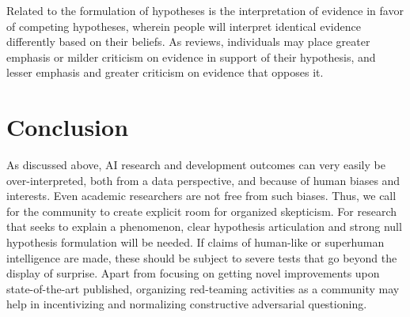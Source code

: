 \documentclass{article}
\theoremstyle{plain}
\theoremstyle{definition}
\theoremstyle{remark}
\begin{document}
Related to the formulation of hypotheses is the interpretation of evidence in favor of competing hypotheses, wherein people will interpret identical evidence differently based on their beliefs. As \citet{nickerson1998confirmation} reviews, individuals may place greater emphasis or milder criticism on evidence in support of their hypothesis, and lesser emphasis and greater criticism on evidence that opposes it. 


\section{Conclusion}
As discussed above, AI research and development outcomes can very easily be over-interpreted, both from a data perspective, and because of human biases and interests. Even academic researchers are not free from such biases. Thus, we call for the community to create explicit room for organized skepticism. For research that seeks to explain a phenomenon, clear hypothesis articulation and strong null hypothesis formulation will be needed. If claims of human-like or superhuman intelligence are made, these should be subject to severe tests \cite{claesen2022severity} that go beyond the display of surprise. Apart from focusing on getting novel improvements upon state-of-the-art published, organizing red-teaming activities as a community may help in incentivizing and normalizing constructive adversarial questioning.
\end{document}
